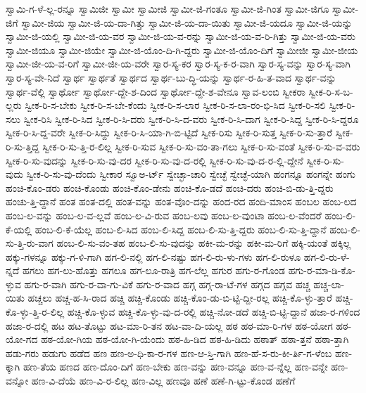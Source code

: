 {ಸ್ವಾಮಿ-ಗ-ಳೆ-ಲ್ಲ-ರನ್ನೂ
ಸ್ವಾಮಿಜೀ
ಸ್ವಾಮೀ
ಸ್ವಾಮೀಜಿ
ಸ್ವಾಮೀ-ಜಿ-ಗಂತೂ
ಸ್ವಾಮೀ-ಜಿ-ಗಿಂತ
ಸ್ವಾಮೀ-ಜಿಗೂ
ಸ್ವಾಮೀ-ಜಿಗೆ
ಸ್ವಾಮೀ-ಜಿಯ
ಸ್ವಾಮೀ-ಜಿ-ಯ-ದಾ-ಗಿತ್ತು
ಸ್ವಾಮೀ-ಜಿ-ಯ-ದಾ-ಯಿತು
ಸ್ವಾಮೀ-ಜಿ-ಯದೂ
ಸ್ವಾಮೀ-ಜಿ-ಯನ್ನು
ಸ್ವಾಮೀ-ಜಿ-ಯಲ್ಲಿ
ಸ್ವಾಮೀ-ಜಿ-ಯ-ವರ
ಸ್ವಾಮೀ-ಜಿ-ಯ-ವ-ರನ್ನು
ಸ್ವಾಮೀ-ಜಿ-ಯ-ವ-ರಿ-ಗಿತ್ತು
ಸ್ವಾಮೀ-ಜಿ-ಯ-ವರು
ಸ್ವಾಮೀ-ಜಿಯೂ
ಸ್ವಾಮೀ-ಜಿಯೇ
ಸ್ವಾಮೀ-ಜಿ-ಯೊಂ-ದಿ-ಗಿ-ದ್ದರು
ಸ್ವಾಮೀ-ಜಿ-ಯೊಂ-ದಿಗೆ
ಸ್ವಾಮೀಜೀ
ಸ್ವಾಮೀ-ಜೀಯ
ಸ್ವಾಮೀ-ಜೀ-ಯ-ವ-ರಿಗೆ
ಸ್ವಾಮೀ-ಜೀ-ಯ-ವರೇ
ಸ್ವಾರ-ಸ್ಯ-ಕರ
ಸ್ವಾರ-ಸ್ಯ-ಕ-ರ-ವಾಗಿ
ಸ್ವಾರ-ಸ್ಯ-ವನ್ನು
ಸ್ವಾರ-ಸ್ಯ-ವಾಗಿ
ಸ್ವಾರ-ಸ್ಯ-ವೇ-ನಿದೆ
ಸ್ವಾರ್ಥ
ಸ್ವಾರ್ಥತೆ
ಸ್ವಾರ್ಥದ
ಸ್ವಾರ್ಥ-ಬು-ದ್ಧಿ-ಯನ್ನು
ಸ್ವಾರ್ಥ-ರ-ಹಿ-ತ-ವಾದ
ಸ್ವಾರ್ಥ-ವನ್ನು
ಸ್ವಾರ್ಥ-ವೆಲ್ಲಿ
ಸ್ವಾರ್ಥೋ
ಸ್ವಾರ್ಥೋ-ದ್ದೇ-ಶ-ದಿಂದ
ಸ್ವಾರ್ಥೋ-ದ್ದೇ-ಶ-ವೇನೂ
ಸ್ವಾವ-ಲಂಬಿ
ಸ್ವೀಕರಾ
ಸ್ವೀಕ-ರಿ-ಸ-ಬ-ಲ್ಲರು
ಸ್ವೀಕ-ರಿ-ಸ-ಬೇಕು
ಸ್ವೀಕ-ರಿ-ಸ-ಬೇ-ಕೆಂದು
ಸ್ವೀಕ-ರಿ-ಸ-ಲಾರ
ಸ್ವೀಕ-ರಿ-ಸ-ಲಾ-ರಂ-ಭಿ-ಸಿದ
ಸ್ವೀಕ-ರಿ-ಸಲಿ
ಸ್ವೀಕ-ರಿ-ಸಲು
ಸ್ವೀಕ-ರಿಸಿ
ಸ್ವೀಕ-ರಿ-ಸಿದ
ಸ್ವೀಕ-ರಿ-ಸಿ-ದರು
ಸ್ವೀಕ-ರಿ-ಸಿ-ದ-ವರು
ಸ್ವೀಕ-ರಿ-ಸಿ-ದಾಗ
ಸ್ವೀಕ-ರಿ-ಸಿದ್ದ
ಸ್ವೀಕ-ರಿ-ಸಿ-ದ್ದರೂ
ಸ್ವೀಕ-ರಿ-ಸಿ-ದ್ದ-ವರೇ
ಸ್ವೀಕ-ರಿ-ಸಿದ್ದು
ಸ್ವೀಕ-ರಿ-ಸಿ-ಯಾ-ಗಿ-ಬಿ-ಟ್ಟಿದೆ
ಸ್ವೀಕ-ರಿಸು
ಸ್ವೀಕ-ರಿ-ಸುತ್ತ
ಸ್ವೀಕ-ರಿ-ಸು-ತ್ತಾರೆ
ಸ್ವೀಕ-ರಿ-ಸು-ತ್ತಿದ್ದ
ಸ್ವೀಕ-ರಿ-ಸು-ತ್ತಿ-ರ-ಲಿಲ್ಲ
ಸ್ವೀಕ-ರಿ-ಸುವ
ಸ್ವೀಕ-ರಿ-ಸು-ವಂ-ತಾ-ಗಲು
ಸ್ವೀಕ-ರಿ-ಸು-ವಂತೆ
ಸ್ವೀಕ-ರಿ-ಸು-ವ-ವರು
ಸ್ವೀಕ-ರಿ-ಸು-ವುದನ್ನು
ಸ್ವೀಕ-ರಿ-ಸು-ವು-ದರ
ಸ್ವೀಕ-ರಿ-ಸು-ವು-ದ-ರಲ್ಲಿ
ಸ್ವೀಕ-ರಿ-ಸು-ವು-ದ-ರ-ಲ್ಲಿ-ದ್ದೇನೆ
ಸ್ವೀಕ-ರಿ-ಸು-ವುದು
ಸ್ವೀಕ-ರಿ-ಸು-ವು-ದೆಂದು
ಸ್ವೀಕಾರ
ಸ್ವೂಅ-ರ್ಟ್
ಸ್ವೇಚ್ಛಾ-ಚಾರಿ
ಸ್ವೇಚ್ಛೆ
ಸ್ವೇಚ್ಛೆ-ಯಾಗಿ
ಹಂಗನ್ನೂ
ಹಂಗನ್ನೇ
ಹಂಗು
ಹಂಚಿ-ಕೊಂ-ಡರು
ಹಂಚಿ-ಕೊಂಡು
ಹಂಚಿ-ಕೊಂ-ಡೇನು
ಹಂಚಿ-ಕೊ-ಡದೆ
ಹಂಚಿ-ದರು
ಹಂಚಿ-ಬಿ-ಡು-ತ್ತಿ-ದ್ದರು
ಹಂಚು-ತ್ತಿ-ದ್ದಾನೆ
ಹಂತ
ಹಂತ-ದಲ್ಲಿ
ಹಂತ-ವನ್ನು
ಹಂತ-ವೊಂ-ದನ್ನು
ಹಂದ-ರದ
ಹಂದಿ-ಮಾಂಸ
ಹಂಬಲ
ಹಂಬ-ಲದ
ಹಂಬ-ಲ-ವನ್ನು
ಹಂಬ-ಲ-ವ-ಲ್ಲವೆ
ಹಂಬ-ಲ-ವಿ-ರುವ
ಹಂಬ-ಲವು
ಹಂಬ-ಲ-ವುಂಟಾ
ಹಂಬ-ಲ-ವೆಂದರೆ
ಹಂಬ-ಲಿ-ಕೆ-ಯಲ್ಲಿ
ಹಂಬ-ಲಿ-ಕೆ-ಯೆಲ್ಲ
ಹಂಬ-ಲಿ-ಸಿದ
ಹಂಬ-ಲಿ-ಸಿದ್ದ
ಹಂಬ-ಲಿ-ಸು-ತ್ತಿ-ದ್ದರು
ಹಂಬ-ಲಿ-ಸು-ತ್ತಿ-ದ್ದಾನೆ
ಹಂಬ-ಲಿ-ಸು-ತ್ತಿ-ರು-ವಾಗ
ಹಂಬ-ಲಿ-ಸು-ವಂ-ತಹ
ಹಂಬ-ಲಿ-ಸು-ವುದನ್ನು
ಹಕೀ-ಮ-ರನ್ನು
ಹಕೀ-ಮ-ರಿಗೆ
ಹಕ್ಕಿ-ಯಂತೆ
ಹಕ್ಕಿಲ್ಲ
ಹಕ್ಕು-ಗಳನ್ನೂ
ಹಕ್ಕು-ಗ-ಳಿ-ಗಾಗಿ
ಹಗ-ಲಿ-ನಲ್ಲಿ
ಹಗ-ಲಿ-ನಷ್ಟು
ಹಗ-ಲಿ-ರು-ಳು-ಗಳು
ಹಗ-ಲಿ-ರುಳೂ
ಹಗ-ಲಿ-ರು-ಳೆ-ನ್ನದೆ
ಹಗಲು
ಹಗ-ಲು-ಹೊತ್ತು
ಹಗಲೂ
ಹಗ-ಲೂ-ರಾತ್ರಿ
ಹಗ-ಲೆಲ್ಲ
ಹಗುರ
ಹಗು-ರ-ಗೊಂಡ
ಹಗು-ರ-ಮಾ-ಡಿ-ಕೊ-ಳ್ಳುವ
ಹಗು-ರ-ವಾಗಿ
ಹಗು-ರ-ವಾ-ಗು-ವಿಕೆ
ಹಗು-ರ-ವಾದ
ಹಗ್ಗ
ಹಗ್ಗ-ರಾ-ಟೆ-ಗಳ
ಹಗ್ಗದ
ಹಗ್ಗವ
ಹಚ್ಚ
ಹಚ್ಚ-ಲಾ-ಯಿತು
ಹಚ್ಚಲು
ಹಚ್ಚ-ಹ-ಸಿ-ರಾದ
ಹಚ್ಚಿ
ಹಚ್ಚಿ-ಕೊಂಡು
ಹಚ್ಚಿ-ಕೊಂ-ಡು-ಬಿ-ಟ್ಟಿ-ದ್ದೀ-ರಲ್ಲ
ಹಚ್ಚಿ-ಕೊ-ಳ್ಳು-ತ್ತಾರೆ
ಹಚ್ಚಿ-ಕೊ-ಳ್ಳು-ತ್ತಿ-ರ-ಲಿಲ್ಲ
ಹಚ್ಚಿ-ಕೊ-ಳ್ಳುವ
ಹಚ್ಚಿ-ಕೊ-ಳ್ಳು-ವು-ದ-ರಲ್ಲಿ
ಹಚ್ಚಿ-ನೋ-ಡದೆ
ಹಚ್ಚಿ-ಬಿ-ಟ್ಟಿ-ದ್ದಾನೆ
ಹಜಾ-ರ-ಗಳಿಂದ
ಹಜಾ-ರ-ದಲ್ಲಿ
ಹಟ
ಹಟ-ತೊಟ್ಟು
ಹಟ-ಮಾ-ರಿ-ತನ
ಹಟ-ವಾ-ದಿ-ಯಲ್ಲ
ಹಠ
ಹಠ-ಮಾ-ರಿ-ಗಳ
ಹಠ-ಯೋಗ
ಹಠ-ಯೋ-ಗದ
ಹಠ-ಯೋ-ಗಿಯ
ಹಠ-ಯೋ-ಗಿ-ಯೆಂದು
ಹಠ-ಹಿ-ಡಿದ
ಹಠ-ಹಿ-ಡಿದು
ಹಠಾತ್
ಹಠಾ-ತ್ತನೆ
ಹಠಾ-ತ್ತಾಗಿ
ಹಡು-ಗರು
ಹಡುಗು
ಹಡೆದ
ಹಣ
ಹಣ-ಅ-ಧಿ-ಕಾ-ರ-ಗಳ
ಹಣ-ಆ-ಸ್ತಿ-ಗಾಗಿ
ಹಣ-ಹೆ-ಸ-ರು-ಕೀ-ರ್ತಿ-ಗ-ಳೆಂಬ
ಹಣ-ಕ್ಕಾಗಿ
ಹಣ-ತೆಯ
ಹಣದ
ಹಣ-ದೊಂ-ದಿಗೆ
ಹಣ-ಬೇಕು
ಹಣ-ವನ್ನು
ಹಣ-ವನ್ನೂ
ಹಣ-ವ-ನ್ನೆಲ್ಲ
ಹಣ-ವನ್ನೇ
ಹಣ-ವನ್ನೋ
ಹಣ-ವಿ-ದೆಯೆ
ಹಣ-ವಿ-ರ-ಲಿಲ್ಲ
ಹಣ-ವಿಲ್ಲ
ಹಣವೂ
ಹಣೆ
ಹಣೆ-ಗಿ-ಟ್ಟು-ಕೊಂಡ
ಹಣೆಗೆ
}
